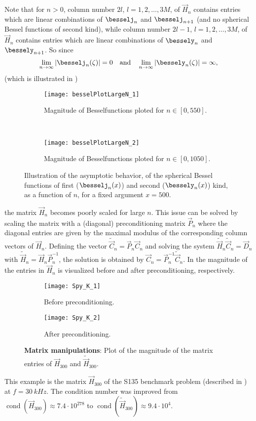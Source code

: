 Note that for $n>0$, column number $2l$, $l=1, 2, \dots, 3M$, of $\vec{H}_n$ contains entries which are linear combinations of $\besselj_n$ and $\besselj_{n+1}$ (and no spherical Bessel functions of second kind), while column number $2l-1$, $l=1, 2, \dots, 3M$, of $\vec{H}_n$ contains entries which are linear combinations of $\bessely_n$ and $\bessely_{n+1}$. So since
\begin{equation}
	\lim_{n\to\infty} |\besselj_n(\zeta)| = 0\quad\text{and}\quad \lim_{n\to\infty} |\bessely_n(\zeta)| = \infty,
\end{equation}
(which is illustrated in )
\begin{figure}
	\centering
	\begin{subfigure}[t]{0.48\textwidth}
		\centering
		\texttt{[image: besselPlotLargeN\_1]}
		\caption{Magnitude of Besselfunctions ploted for ${n\in[0,550]}$.}
	\end{subfigure}
	~
	\begin{subfigure}[t]{0.48\textwidth}
		\centering
		\texttt{[image: besselPlotLargeN\_2]}
		\caption{Magnitude of Besselfunctions ploted for $n\in[0,1050]$.}
	\end{subfigure}
	\caption{Illustration of the asymptotic behavior, of the spherical Bessel functions of first ($\besselj_n(x)$) and second ($\bessely_n(x)$) kind, as a function of $n$, for a fixed argument $x=500$.}
	\label{Fig1:besselPlotLargeN}
\end{figure}
the matrix $\vec{H}_n$ becomes poorly scaled for large $n$. This issue can be solved by scaling the matrix with a (diagonal) preconditioning matrix $\vec{P}_n$ where the diagonal entries are given by the maximal modulus of the corresponding column vectors of $\vec{H}_n$. Defining the vector $\tilde{\vec{C}}_n = \vec{P}_n\vec{C}_n$ and solving the system $\tilde{\vec{H}}_n\tilde{\vec{C}}_n = \vec{D}_n$ with $\tilde{\vec{H}}_n = \vec{H}_n \vec{P}_n^{-1}$, the solution is obtained by $\vec{C}_n = \vec{P}_n^{-1}\tilde{\vec{C}}_n$. In  the magnitude of the entries in $\vec{H}_n$ is visualized before and after preconditioning, respectively.
\begin{figure}
	\centering
	\begin{subfigure}{\textwidth}
		\centering
		\texttt{[image: Spy\_K\_1]}
		\caption{Before preconditioning.}
		\label{Fig1:Spy2K}
	\end{subfigure}
	\par\bigskip
	\begin{subfigure}{\textwidth}
		\centering
		\texttt{[image: Spy\_K\_2]}
		\caption{After preconditioning.}
		\label{Fig1:Spy2K2}
	\end{subfigure}
	\caption{\textbf{Matrix manipulations}: Plot of the magnitude of the matrix entries of $\vec{H}_{300}$ and $\tilde{\vec{H}}_{300}$.}
	\label{Fig1:SpyK}
\end{figure}
This example is the matrix $\vec{H}_{300}$ of the S135 benchmark problem (described in ) at $f=\SI{30}{kHz}$. The condition number was improved from $\operatorname{cond}(\vec{H}_{300}) \approx 7.4\cdot 10^{278}$ to $\operatorname{cond}(\tilde{\vec{H}}_{300}) \approx 9.4\cdot 10^4$.

